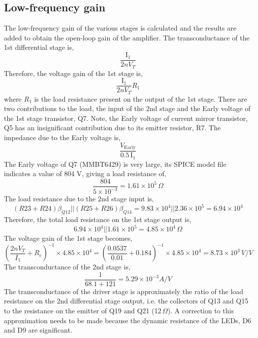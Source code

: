 \documentclass[a4paper,10pt, oneside]{article}
\begin{document}
\subsection*{Low-frequency gain}
The low-frequency gain of the various stages is calculated and the results are added to obtain the open-loop gain of the amplifier.
The transconductance of the 1st differential stage is,
\begin{equation}
\frac{\textrm{I}_{1}}{2nV_{T}} 
\end{equation}
Therefore, the voltage gain of the 1st stage is,
\begin{equation}
\frac{\textrm{I}_{1}}{2nV_{T}}R_{1}
\end{equation}
where $R_{1}$ is the load resistance present on the output of the 1st stage. There are two contributions to the load, 
the input of the 2nd stage and the Early voltage of the 1st stage transistor, Q7. Note, the Early voltage of current mirror transistor, Q5 has an insignificant contribution due to its emitter resistor, R7. The impedance due to the Early voltage is,
\begin{equation}
 \frac{V_{\textrm{Early}}}{0.5\,\textrm{I}_{1}}
\end{equation}
The Early voltage of Q7 (MMBT6429) is very large, its SPICE model file indicates a value of 804 V, giving a load resistance of,
\begin{equation}
\frac{804}{5\times 10^{-3}} =  1.61\times 10^{5}\,\Omega
\end{equation}
The load resistance due to the 2nd stage input is,
\begin{equation}
(R23+R24)\beta_{Q12}||(R25+R26)\beta_{Q14} = 9.83\times 10^{4}||2.36\times 10^{5} = 6.94\times 10^{4}
\end{equation}
Therefore, the total load resistance on the 1st stage output is,
\begin{equation}
6.94\times 10^{4}||1.61\times 10^{5} = 4.85\times 10^{4}\,\Omega
\end{equation}
The voltage gain of the 1st stage becomes,
\begin{equation}
 \left(\frac{2nV_{T}}{I_{1}}+R_{e}\right)^{-1}\times 4.85\times 10^{4} = \left(\frac{0.0537}{0.01}+0.184\right)^{-1}\times 4.85\times 10^{4} = 8.73\times 10^{3}\,V/V
\end{equation}
The transconductance of the 2nd stage is,
\begin{equation}
\frac{1}{68.1+121} =  5.29\times 10^{-3} A/V
\end{equation}
The transconductance of the driver stage is approximately the ratio of the load resistance on the 2nd differential stage output, i.e. the collectors of Q13 and Q15 to the resistance on the emitter of Q19 and Q21 (12$\,\Omega$). A correction to this approximation needs to be made because the dynamic resistance of the LEDs, D6 and D9 are significant. 
\end{document}
